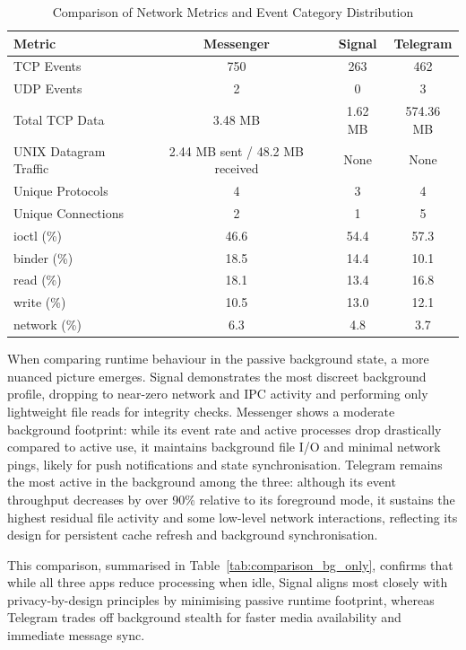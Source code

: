 \documentclass[a4paper,12pt]{report}
\begin{document}
\begin{table}[H]
    \centering
    \caption{Comparison of Network Metrics and Event Category Distribution}
    \label{tab:comparison_network_categories}
    \begin{tabular}{|l|c|c|c|}
        \hline
        \textbf{Metric} & \textbf{Messenger} & \textbf{Signal} & \textbf{Telegram} \\
        \hline
        TCP Events & 750 & 263 & 462 \\
        UDP Events & 2 & 0 & 3 \\
        Total TCP Data & 3.48 MB & 1.62 MB & 574.36 MB \\
        UNIX Datagram Traffic & 2.44 MB sent / 48.2 MB received & None & None \\
        Unique Protocols & 4 & 3 & 4 \\
        Unique Connections & 2 & 1 & 5 \\
        \hline
        ioctl (\%) & 46.6 & 54.4 & 57.3 \\
        binder (\%) & 18.5 & 14.4 & 10.1 \\
        read (\%) & 18.1 & 13.4 & 16.8 \\
        write (\%) & 10.5 & 13.0 & 12.1 \\
        network (\%) & 6.3 & 4.8 & 3.7 \\
        \hline
    \end{tabular}
\end{table}

When comparing runtime behaviour in the passive background state, a more nuanced picture emerges. Signal demonstrates the most discreet background profile, dropping to near-zero network and IPC activity and performing only lightweight file reads for integrity checks. Messenger shows a moderate background footprint: while its event rate and active processes drop drastically compared to active use, it maintains background file I/O and minimal network pings, likely for push notifications and state synchronisation. Telegram remains the most active in the background among the three: although its event throughput decreases by over 90\% relative to its foreground mode, it sustains the highest residual file activity and some low-level network interactions, reflecting its design for persistent cache refresh and background synchronisation.

This comparison, summarised in Table~\ref{tab:comparison_bg_only}, confirms that while all three apps reduce processing when idle, Signal aligns most closely with privacy-by-design principles by minimising passive runtime footprint, whereas Telegram trades off background stealth for faster media availability and immediate message sync.
\end{document}
